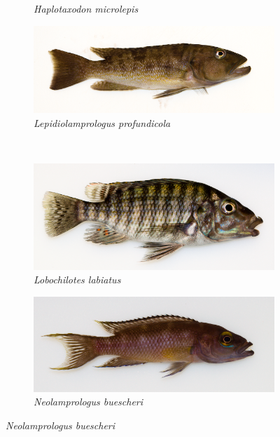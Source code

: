 \begin{figure}
\begin{subfigure}[t]{\fishfigwidth}
        \small
        \caption{\textit{Haplotaxodon microlepis}}
    \end{subfigure}
    \begin{subfigure}[t]{\fishfigwidth}
        \includegraphics[width=\fishfigwidth]{figures/host_phenotypes/Lepidiolamprologus_profundicola}
        \small
        \caption{\textit{Lepidiolamprologus profundicola}} 
    \end{subfigure} \\
    \begin{subfigure}[t]{\fishfigwidth}
        \includegraphics[width=\fishfigwidth]{figures/host_phenotypes/Lobochilotes_labiatus}
        \small
        \caption{\textit{Lobochilotes labiatus}}
    \end{subfigure}
    \begin{subfigure}[t]{\fishfigwidth}
        \includegraphics[width=\fishfigwidth]{figures/host_phenotypes/Neolamprologus_buescheri}
        \small
        \caption{\textit{Neolamprologus buescheri}}

\end{subfigure}
\end{figure}
